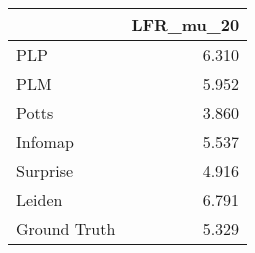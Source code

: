 \begin{tabular}{lr}
\toprule
{} & LFR_mu_20 \\
\midrule
PLP          &     6.310 \\
PLM          &     5.952 \\
Potts        &     3.860 \\
Infomap      &     5.537 \\
Surprise     &     4.916 \\
Leiden       &     6.791 \\
Ground Truth &     5.329 \\
\bottomrule
\end{tabular}
